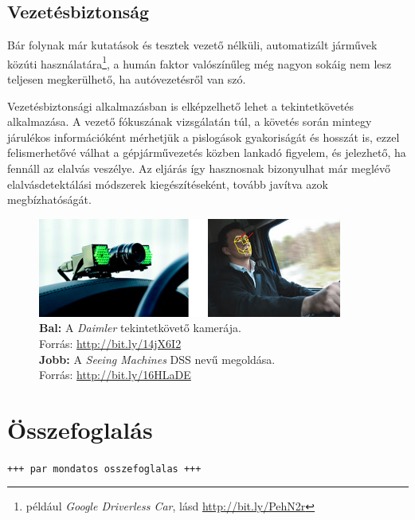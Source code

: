 \subsection{Vezetésbiztonság}\label{sect:orvosi_felhasznalas}

Bár folynak már kutatások és tesztek vezető nélküli, automatizált járművek közúti használatára\footnote{például \emph{Google Driverless Car}, lásd \url{http://bit.ly/PehN2r}}, a humán faktor valószínűleg még nagyon sokáig nem lesz teljesen megkerülhető, ha autóvezetésről van szó.

Vezetésbiztonsági alkalmazásban is elképzelhető lehet a tekintetkövetés alkalmazása. A vezető fókuszának vizsgálatán túl, a követés során mintegy járulékos információként mérhetjük a pislogások gyakoriságát és hosszát is, ezzel felismerhetővé válhat a gépjárművezetés közben lankadó figyelem, és jelezhető, ha fennáll az elalvás veszélye. Az eljárás így hasznosnak bizonyulhat már meglévő elalvásdetektálási módszerek \cite{sleepdet} kiegészítéseként, tovább javítva azok megbízhatóságát.

\begin{figure}[!ht]
\centering
\includegraphics[width=100mm, keepaspectratio]{figures/driving.png}
\caption{\textbf{Bal:} A \emph{Daimler} tekintetkövető kamerája. \\ Forrás: \url{http://bit.ly/14jX6I2} \\
\textbf{Jobb:} A \emph{Seeing Machines} DSS nevű megoldása. \\ Forrás: \url{http://bit.ly/16HLaDE}}
\label{fig:driving}
\end{figure}

\section{Összefoglalás}\label{sect:felh_osszefoglalas}

\texttt{+++ par mondatos osszefoglalas +++}